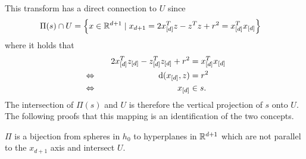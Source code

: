 This transform has a direct connection to $U$ since
\begin{align}
    \Pi(s) \cap U &= \left\{ x \in \mathbb{R}^{d+1} \mid x_{d+1} = 2x_{[d]}^Tz - z^Tz + r^2 = x_{[d]}^Tx_{[d]} \right\}
\end{align}
where it holds that
\begin{alignat}{2}
    &&2x_{[d]}^Tz_{[d]} - z_{[d]}^Tz_{[d]} + r^2 &= x_{[d]}^Tx_{[d]}\\
    &\Leftrightarrow\quad& \operatorname{d}(x_{[d]}, z) &= r^2\\
    &\Leftrightarrow\quad& x_{[d]} &\in s.
\end{alignat}
The intersection of $\Pi(s)$ and $U$ is therefore the vertical projection of $s$ onto $U$.
The following proofs that this mapping is an identification of the two concepts.
\begin{lemma}
    \label{lem:pibijection}
    $\Pi$ is a bijection from spheres in $h_0$ to hyperplanes in $\mathbb{R}^{d+1}$ which are not parallel to the $x_{d+1}$ axis and intersect $U$.
\end{lemma}

